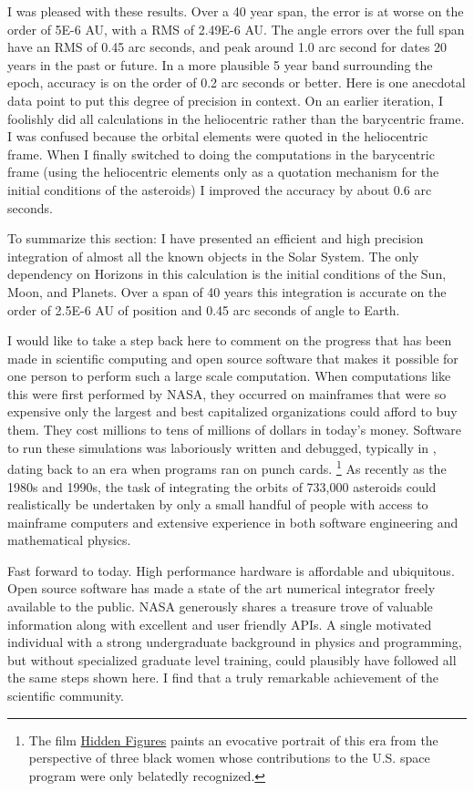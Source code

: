 I was pleased with these results.
Over a 40 year span, the error is at worse on the order of 5E-6 AU, with a RMS of 2.49E-6 AU.
The angle errors over the full span have an RMS of 0.45 arc seconds,
and peak around 1.0 arc second for dates 20 years in the past or future.
In a more plausible 5 year band surrounding the epoch, accuracy is on the order of 0.2 arc seconds or better.
Here is one anecdotal data point to put this degree of precision in context.
On an earlier iteration, I foolishly did all calculations in the heliocentric rather than the barycentric frame.
I was confused because the orbital elements were quoted in the heliocentric frame.
When I finally switched to doing the computations in the barycentric frame 
(using the heliocentric elements only as a quotation mechanism for the initial conditions of the asteroids)
I improved the accuracy by about 0.6 arc seconds.

To summarize this section: I have presented an efficient and high precision integration of almost all the known objects in the Solar System.
The only dependency on Horizons in this calculation is the initial conditions of the Sun, Moon, and Planets.
Over a span of 40 years this integration is accurate on the order of 2.5E-6 AU of position and 0.45 arc seconds of angle to Earth.

I would like to take a step back here to comment on the progress that has been made in scientific computing and open source software
that makes it possible for one person to perform such a large scale computation.
When computations like this were first performed by NASA, they occurred on mainframes that were so expensive only the largest 
and best capitalized organizations could afford to buy them.
They cost millions to tens of millions of dollars in today's money.
Software to run these simulations was laboriously written and debugged, typically in , dating back to an era when programs ran on punch cards.
\footnote{The film \href{https://en.wikipedia.org/wiki/Hidden_Figures}{Hidden Figures} paints an evocative portrait of this era
from the perspective of three black women whose contributions to the U.S. space program were only belatedly recognized.}
As recently as the 1980s and 1990s, the task of integrating the orbits of 733,000 asteroids could realistically be undertaken by only a small
handful of people with access to mainframe computers and extensive experience in both software engineering and mathematical physics.

Fast forward to today.  
High performance hardware is affordable and ubiquitous.
Open source software has made a state of the art numerical integrator freely available to the public.
NASA generously shares a treasure trove of valuable information along with excellent and user friendly APIs.
A single motivated individual with a strong undergraduate background in physics and programming,
but without specialized graduate level training, could plausibly have followed all the same steps shown here.
I find that a truly remarkable achievement of the scientific community.

